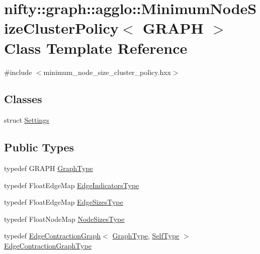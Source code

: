 \hypertarget{classnifty_1_1graph_1_1agglo_1_1MinimumNodeSizeClusterPolicy}{}\section{nifty\+:\+:graph\+:\+:agglo\+:\+:Minimum\+Node\+Size\+Cluster\+Policy$<$ G\+R\+A\+P\+H $>$ Class Template Reference}
\label{classnifty_1_1graph_1_1agglo_1_1MinimumNodeSizeClusterPolicy}


{\ttfamily \#include $<$minimum\+\_\+node\+\_\+size\+\_\+cluster\+\_\+policy.\+hxx$>$}

\subsection*{Classes}
\begin{DoxyCompactItemize}
\item 
struct \hyperlink{structnifty_1_1graph_1_1agglo_1_1MinimumNodeSizeClusterPolicy_1_1Settings}{Settings}
\end{DoxyCompactItemize}
\subsection*{Public Types}
\begin{DoxyCompactItemize}
\item 
typedef G\+R\+A\+P\+H \hyperlink{classnifty_1_1graph_1_1agglo_1_1MinimumNodeSizeClusterPolicy_a6d81a64ca67c9feec052a031552282f0}{Graph\+Type}
\item 
typedef Float\+Edge\+Map \hyperlink{classnifty_1_1graph_1_1agglo_1_1MinimumNodeSizeClusterPolicy_a81a0b54e4eadb98c9a125593b1c6e17c}{Edge\+Indicators\+Type}
\item 
typedef Float\+Edge\+Map \hyperlink{classnifty_1_1graph_1_1agglo_1_1MinimumNodeSizeClusterPolicy_a645ba7b5aabb0fd8cecad292041d929a}{Edge\+Sizes\+Type}
\item 
typedef Float\+Node\+Map \hyperlink{classnifty_1_1graph_1_1agglo_1_1MinimumNodeSizeClusterPolicy_a64f036ec68ecf74d84f9238f77957c1e}{Node\+Sizes\+Type}
\item 
typedef \hyperlink{classnifty_1_1graph_1_1EdgeContractionGraph}{Edge\+Contraction\+Graph}$<$ \hyperlink{classnifty_1_1graph_1_1agglo_1_1MinimumNodeSizeClusterPolicy_a6d81a64ca67c9feec052a031552282f0}{Graph\+Type}, \hyperlink{classnifty_1_1graph_1_1agglo_1_1MinimumNodeSizeClusterPolicy}{Self\+Type} $>$ \hyperlink{classnifty_1_1graph_1_1agglo_1_1MinimumNodeSizeClusterPolicy_a5c67401c61d1d283b73c3ce8a31faeb9}{Edge\+Contraction\+Graph\+Type}
\end{DoxyCompactItemize}
